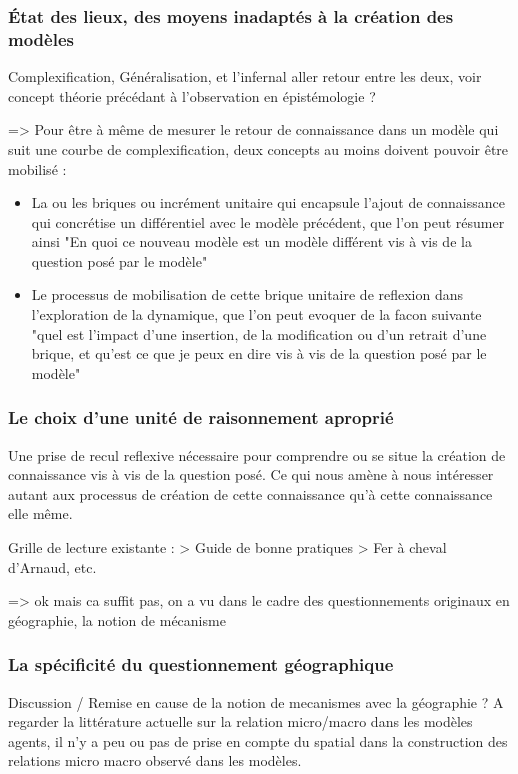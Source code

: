 {\subsubsection{État des lieux, des moyens inadaptés à la création des modèles}

Complexification, Généralisation, et l'infernal aller retour entre les deux, voir concept théorie précédant à l'observation en épistémologie ?

=> Pour être à même de mesurer le retour de connaissance dans un modèle qui suit une courbe de complexification, deux concepts au moins doivent pouvoir être mobilisé : 

\begin{itemize}
\item La ou les briques ou incrément unitaire qui encapsule l'ajout de connaissance qui concrétise un différentiel avec le modèle précédent, que l'on peut résumer ainsi "En quoi ce nouveau modèle est un modèle différent vis à vis de la question posé par le modèle"
\item Le processus de mobilisation de cette brique unitaire de reflexion dans l'exploration de la dynamique, que l'on peut evoquer de la facon suivante "quel est l'impact d'une insertion, de la modification ou d'un retrait d'une brique, et qu'est ce que je peux en dire vis à vis de la question posé par le modèle"
\end{itemize}

\subsubsection{Le choix d'une unité de raisonnement aproprié}

Une prise de recul reflexive nécessaire pour comprendre ou se situe la création de connaissance vis à vis de la question posé.
Ce qui nous amène à nous intéresser autant aux processus de création de cette connaissance qu'à cette connaissance elle même.

Grille de lecture existante : 
> Guide de bonne pratiques
> Fer à cheval d'Arnaud, etc.

=> ok mais ca suffit pas, on a vu dans le cadre des questionnements originaux en géographie, la notion de mécanisme

\subsubsection{La spécificité du questionnement géographique}

Discussion / Remise en cause de la notion de mecanismes avec la géographie ? 
A regarder la littérature actuelle sur la relation micro/macro dans les modèles agents, il n'y a peu ou pas de prise en compte du spatial dans la construction des relations micro macro observé dans les modèles.

}
